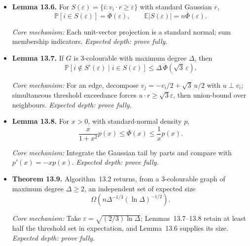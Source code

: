 \documentclass[11pt,a4paper]{article}
\newcommand{\E}{\mathbb E}
\newcommand{\Prb}{\mathbb P}
\newcommand{\1}{\mathbf 1}
\newcommand{\catalogue}[4]{%
  \item \textbf{#1.} #2\par
  {\footnotesize\emph{Core mechanism:} #3
  \emph{Expected depth: #4.}}}
\begin{document}
\begin{itemize}
\catalogue{Lemma 13.6}{For
$S(\varepsilon)=\{i:v_i\cdot r\geq\varepsilon\}$ with standard Gaussian $r$,
\[
\Prb[i\in S(\varepsilon)]=\overline\Phi(\varepsilon),
\qquad \E|S(\varepsilon)|=n\overline\Phi(\varepsilon).
\]}{Each unit-vector projection is a standard normal; sum membership
indicators.}{prove fully}

\catalogue{Lemma 13.7}{If $G$ is $3$-colourable with maximum degree
$\Delta$, then
\[
\Prb[i\notin S'(\varepsilon)\mid i\in S(\varepsilon)]
\leq\Delta\,\overline\Phi(\sqrt3\,\varepsilon).
\]}
{For an edge, decompose $v_j=-v_i/2+\sqrt3\,u/2$ with
$u\perp v_i$; simultaneous threshold exceedance forces
$u\cdot r\geq\sqrt3\varepsilon$, then union-bound over neighbours.}
{prove fully}

\catalogue{Lemma 13.8}{For $x>0$, with standard-normal density $p$,
\[
\frac{x}{1+x^2}p(x)\leq\overline\Phi(x)\leq\frac1x p(x).
\]}
{Integrate the Gaussian tail by parts and compare with
$p'(x)=-xp(x)$.}{prove fully}

\catalogue{Theorem 13.9}{Algorithm~13.2 returns, from a $3$-colourable graph
of maximum degree $\Delta\geq2$, an independent set of expected size
\[
\Omega\!\left(n\Delta^{-1/3}(\ln\Delta)^{-1/2}\right).
\]}{Take $\varepsilon=\sqrt{(2/3)\ln\Delta}$; Lemmas~13.7--13.8 retain at
least half the threshold set in expectation, and Lemma~13.6 supplies its
size.}{prove fully}
\end{itemize}
\end{document}
